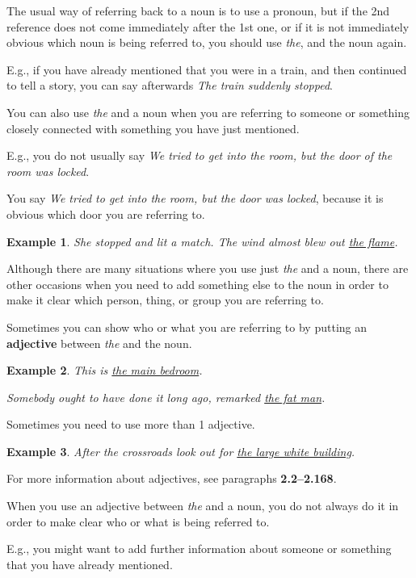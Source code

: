 \documentclass[oneside]{book}
\numberwithin{equation}{section}
\newtheorem{example}{Example}[section]
\begin{document}
%
The usual way of referring back to a noun is to use a pronoun, but if the 2nd reference does not come immediately after the 1st one, or if it is not immediately obvious which noun is being referred to, you should use \textit{the}, and the noun again.

E.g., if you have already mentioned that you were in a train, and then continued to tell a story, you can say afterwards \textit{The train suddenly stopped}.

%
\noindent{} You can also use \textit{the} and a noun when you are referring to someone or something closely connected with something you have just mentioned.

%
E.g., you do not usually say \textit{We tried to get into the room, but the door of the room was locked}.

You say \textit{We tried to get into the room, but the door was locked}, because it is obvious which door you are referring to.
\begin{example}
    She stopped and lit a match. The wind almost blew out \underline{the flame}.    
\end{example}
%
\noindent{} Although there are many situations where you use just \textit{the} and a noun, there are other occasions when you need to add something else to the noun in order to make it clear which person, thing, or group you are referring to.

%
\noindent{} Sometimes you can show who or what you are referring to by putting an \textbf{adjective} between \textit{the} and the noun.
\begin{example}
    This is \underline{the main bedroom}.
    
    Somebody ought to have done it long ago, remarked \underline{the fat man}.
\end{example}
Sometimes you need to use more than 1 adjective.
\begin{example}
    After the crossroads look out for \underline{the large white building}.
\end{example}
For more information about adjectives, see paragraphs \textbf{2.2--2.168}.

%
\noindent{} When you use an adjective between \textit{the} and a noun, you do not always do it in order to make clear who or what is being referred to.

%
E.g., you might want to add further information about someone or something that you have already mentioned.
\end{document}
